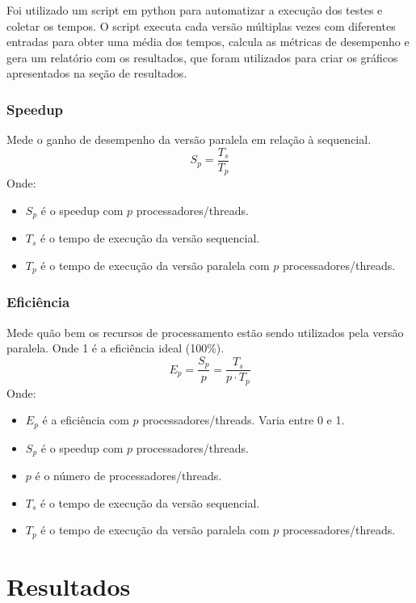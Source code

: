 \documentclass[12pt, a4paper]{article}
\begin{document}
    Foi utilizado um script em python para automatizar a execução dos testes e coletar os tempos. O script executa cada versão múltiplas vezes com diferentes entradas para obter uma média dos tempos, calcula as métricas de desempenho e gera um relatório com os resultados, que foram utilizados para criar os gráficos apresentados na seção de resultados.

    \subsubsection{Speedup}
	Mede o ganho de desempenho da versão paralela em relação à sequencial.
	\[
		S_{p} = \frac{T_{s}}{T_{p}}
	\]
	Onde:
	\begin{itemize}
		\item $S_{p}$ é o speedup com $p$ processadores/threads.

		\item $T_{s}$ é o tempo de execução da versão sequencial.

		\item $T_{p}$ é o tempo de execução da versão paralela com $p$ processadores/threads.
	\end{itemize}

	\subsubsection{Eficiência}
    Mede quão bem os recursos de processamento estão sendo utilizados pela versão paralela. Onde 1 é a eficiência ideal (100\%).
	\[
		E_{p} = \frac{S_{p}}{p}= \frac{T_{s}}{p \cdot T_{p}}
	\]
	Onde:
	\begin{itemize}
		\item $E_{p}$ é a eficiência com $p$ processadores/threads. Varia entre 0 e 1.

		\item $S_{p}$ é o speedup com $p$ processadores/threads.

        \item $p$ é o número de processadores/threads.

        \item $T_{s}$ é o tempo de execução da versão sequencial.

        \item $T_{p}$ é o tempo de execução da versão paralela com $p$ processadores/threads.
	\end{itemize}

    \newpage
    \section{Resultados}\label{sec:resultados}
\end{document}
